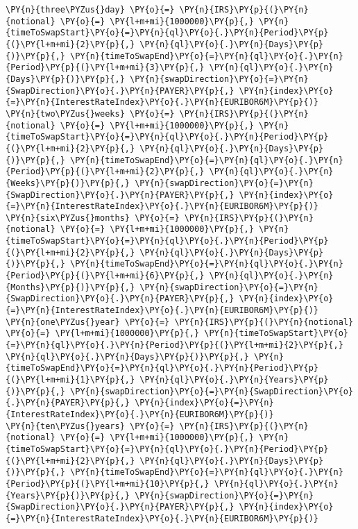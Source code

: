     \begin{tcolorbox}[breakable, size=fbox, boxrule=1pt, pad at break*=1mm,colback=cellbackground, colframe=cellborder]
\begin{Verbatim}[commandchars=\\\{\}]
\PY{n}{three\PYZus{}day} \PY{o}{=} \PY{n}{IRS}\PY{p}{(}\PY{n}{notional} \PY{o}{=} \PY{l+m+mi}{1000000}\PY{p}{,} \PY{n}{timeToSwapStart}\PY{o}{=}\PY{n}{ql}\PY{o}{.}\PY{n}{Period}\PY{p}{(}\PY{l+m+mi}{2}\PY{p}{,} \PY{n}{ql}\PY{o}{.}\PY{n}{Days}\PY{p}{)}\PY{p}{,} \PY{n}{timeToSwapEnd}\PY{o}{=}\PY{n}{ql}\PY{o}{.}\PY{n}{Period}\PY{p}{(}\PY{l+m+mi}{3}\PY{p}{,} \PY{n}{ql}\PY{o}{.}\PY{n}{Days}\PY{p}{)}\PY{p}{,} \PY{n}{swapDirection}\PY{o}{=}\PY{n}{SwapDirection}\PY{o}{.}\PY{n}{PAYER}\PY{p}{,} \PY{n}{index}\PY{o}{=}\PY{n}{InterestRateIndex}\PY{o}{.}\PY{n}{EURIBOR6M}\PY{p}{)}
\PY{n}{two\PYZus{}weeks} \PY{o}{=} \PY{n}{IRS}\PY{p}{(}\PY{n}{notional} \PY{o}{=} \PY{l+m+mi}{1000000}\PY{p}{,} \PY{n}{timeToSwapStart}\PY{o}{=}\PY{n}{ql}\PY{o}{.}\PY{n}{Period}\PY{p}{(}\PY{l+m+mi}{2}\PY{p}{,} \PY{n}{ql}\PY{o}{.}\PY{n}{Days}\PY{p}{)}\PY{p}{,} \PY{n}{timeToSwapEnd}\PY{o}{=}\PY{n}{ql}\PY{o}{.}\PY{n}{Period}\PY{p}{(}\PY{l+m+mi}{2}\PY{p}{,} \PY{n}{ql}\PY{o}{.}\PY{n}{Weeks}\PY{p}{)}\PY{p}{,} \PY{n}{swapDirection}\PY{o}{=}\PY{n}{SwapDirection}\PY{o}{.}\PY{n}{PAYER}\PY{p}{,} \PY{n}{index}\PY{o}{=}\PY{n}{InterestRateIndex}\PY{o}{.}\PY{n}{EURIBOR6M}\PY{p}{)}
\PY{n}{six\PYZus{}months} \PY{o}{=} \PY{n}{IRS}\PY{p}{(}\PY{n}{notional} \PY{o}{=} \PY{l+m+mi}{1000000}\PY{p}{,} \PY{n}{timeToSwapStart}\PY{o}{=}\PY{n}{ql}\PY{o}{.}\PY{n}{Period}\PY{p}{(}\PY{l+m+mi}{2}\PY{p}{,} \PY{n}{ql}\PY{o}{.}\PY{n}{Days}\PY{p}{)}\PY{p}{,} \PY{n}{timeToSwapEnd}\PY{o}{=}\PY{n}{ql}\PY{o}{.}\PY{n}{Period}\PY{p}{(}\PY{l+m+mi}{6}\PY{p}{,} \PY{n}{ql}\PY{o}{.}\PY{n}{Months}\PY{p}{)}\PY{p}{,} \PY{n}{swapDirection}\PY{o}{=}\PY{n}{SwapDirection}\PY{o}{.}\PY{n}{PAYER}\PY{p}{,} \PY{n}{index}\PY{o}{=}\PY{n}{InterestRateIndex}\PY{o}{.}\PY{n}{EURIBOR6M}\PY{p}{)}
\PY{n}{one\PYZus{}year} \PY{o}{=} \PY{n}{IRS}\PY{p}{(}\PY{n}{notional} \PY{o}{=} \PY{l+m+mi}{1000000}\PY{p}{,} \PY{n}{timeToSwapStart}\PY{o}{=}\PY{n}{ql}\PY{o}{.}\PY{n}{Period}\PY{p}{(}\PY{l+m+mi}{2}\PY{p}{,} \PY{n}{ql}\PY{o}{.}\PY{n}{Days}\PY{p}{)}\PY{p}{,} \PY{n}{timeToSwapEnd}\PY{o}{=}\PY{n}{ql}\PY{o}{.}\PY{n}{Period}\PY{p}{(}\PY{l+m+mi}{1}\PY{p}{,} \PY{n}{ql}\PY{o}{.}\PY{n}{Years}\PY{p}{)}\PY{p}{,} \PY{n}{swapDirection}\PY{o}{=}\PY{n}{SwapDirection}\PY{o}{.}\PY{n}{PAYER}\PY{p}{,} \PY{n}{index}\PY{o}{=}\PY{n}{InterestRateIndex}\PY{o}{.}\PY{n}{EURIBOR6M}\PY{p}{)}
\PY{n}{ten\PYZus{}years} \PY{o}{=} \PY{n}{IRS}\PY{p}{(}\PY{n}{notional} \PY{o}{=} \PY{l+m+mi}{1000000}\PY{p}{,} \PY{n}{timeToSwapStart}\PY{o}{=}\PY{n}{ql}\PY{o}{.}\PY{n}{Period}\PY{p}{(}\PY{l+m+mi}{2}\PY{p}{,} \PY{n}{ql}\PY{o}{.}\PY{n}{Days}\PY{p}{)}\PY{p}{,} \PY{n}{timeToSwapEnd}\PY{o}{=}\PY{n}{ql}\PY{o}{.}\PY{n}{Period}\PY{p}{(}\PY{l+m+mi}{10}\PY{p}{,} \PY{n}{ql}\PY{o}{.}\PY{n}{Years}\PY{p}{)}\PY{p}{,} \PY{n}{swapDirection}\PY{o}{=}\PY{n}{SwapDirection}\PY{o}{.}\PY{n}{PAYER}\PY{p}{,} \PY{n}{index}\PY{o}{=}\PY{n}{InterestRateIndex}\PY{o}{.}\PY{n}{EURIBOR6M}\PY{p}{)}


\end{Verbatim}
\end{tcolorbox}
